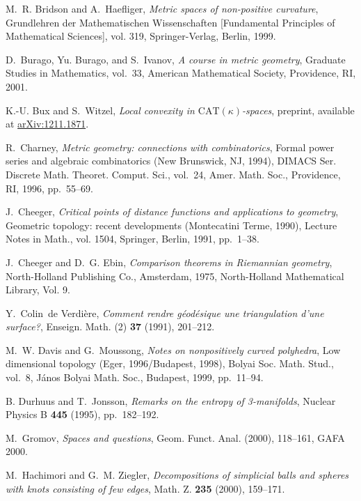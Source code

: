 \documentclass[a4paper,11pt]{article}
\theoremstyle{plain}
\theoremstyle{definition}
\begin{document}
{\begin{thebibliography}{AL{\L}M13}
M.~R. Bridson and A.~Haefliger, \emph{Metric spaces of non-positive curvature},
  Grundlehren der Mathematischen Wissenschaften [Fundamental Principles of
  Mathematical Sciences], vol. 319, Springer-Verlag, Berlin, 1999.



D.~Burago, Yu. Burago, and S.~Ivanov, \emph{A course in metric geometry},
  Graduate Studies in Mathematics, vol.~33, American Mathematical Society,
  Providence, RI, 2001.

K.-U. Bux and S.~Witzel, \emph{Local convexity in
  $\mathrm{CAT}(\kappa)$-spaces}, preprint, available at
  \href{http://arxiv.org/abs/1211.1871}{arXiv:1211.1871}.

R.~Charney, \emph{Metric geometry: connections with combinatorics}, Formal
  power series and algebraic combinatorics ({N}ew {B}runswick, {NJ}, 1994),
  DIMACS Ser. Discrete Math. Theoret. Comput. Sci., vol.~24, Amer. Math. Soc.,
  Providence, RI, 1996, pp.~55--69.

J.~Cheeger, \emph{Critical points of distance functions and applications to
  geometry}, Geometric topology: recent developments ({M}ontecatini {T}erme,
  1990), Lecture Notes in Math., vol. 1504, Springer, Berlin, 1991, pp.~1--38.

J.~Cheeger and D.~G. Ebin, \emph{Comparison theorems in {R}iemannian geometry},
  North-Holland Publishing Co., Amsterdam, 1975, North-Holland Mathematical
  Library, Vol. 9.


Y.~Colin~de Verdi{\`e}re, \emph{Comment rendre g\'eod\'esique une triangulation
  d'une surface?}, Enseign. Math. (2) \textbf{37} (1991), 201--212.


M.~W. Davis and G.~Moussong, \emph{Notes on nonpositively curved polyhedra},
  Low dimensional topology ({E}ger, 1996/{B}udapest, 1998), Bolyai Soc. Math.
  Stud., vol.~8, J\'anos Bolyai Math. Soc., Budapest, 1999, pp.~11--94.


B. Durhuus and T.~Jonsson, \emph{Remarks on the entropy of 3-manifolds},
  Nuclear Physics B \textbf{ 445}
  (1995), pp.~182--192.

M.~Gromov, \emph{Spaces and questions}, Geom. Funct. Anal. (2000), 118--161, GAFA
  2000.

M.~Hachimori and G.~M. Ziegler, \emph{Decompositions of simplicial balls and
  spheres with knots consisting of few edges}, Math. Z. \textbf{235} (2000),
  159--171.


\end{thebibliography}}
\end{document}

